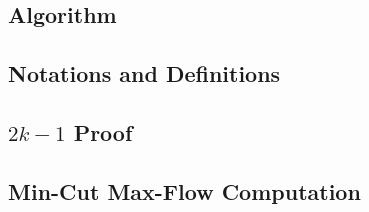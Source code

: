 \subsection{Algorithm}
\label{sec:wfalg}


\subsection{Notations and Definitions}
\label{sec:notdef}

\subsection{$2k-1$ Proof}
\label{sec:2k1p}

\subsection{Min-Cut Max-Flow Computation}
\label{sec:mcfp}
